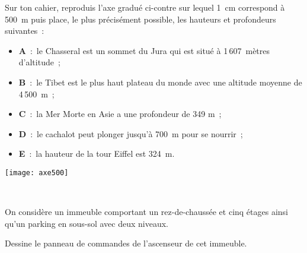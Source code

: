 \begin{exercice}
Sur ton cahier, reproduis l'axe gradué ci-contre sur lequel 1 cm correspond à 500 m puis place, le plus précisément possible, les hauteurs et profondeurs suivantes :

\begin{minipage}[c]{0.8\linewidth}
\begin{itemize}
 \item \textbf{A} : le Chasseral est un sommet du Jura qui est situé à 1\,607 mètres d'altitude ;
 \item \textbf{B} : le Tibet est le plus haut plateau du monde avec une altitude moyenne de 4\,500 m ;
 \item \textbf{C} : la Mer Morte en Asie a une profondeur de 349 m ;
 \item \textbf{D} : le cachalot peut plonger jusqu'à 700 m pour se nourrir ;
 \item \textbf{E} : la hauteur de la tour Eiffel est 324 m.
 \end{itemize}
 \end{minipage} \hfill%
 \begin{minipage}[c]{0.15\linewidth}
 \texttt{[image: axe500]}
  \end{minipage} \\
\end{exercice}


\begin{exercice}
On considère un immeuble comportant un rez-de-chaussée et cinq étages ainsi qu'un parking en sous-sol avec deux niveaux. 

Dessine le panneau de commandes de l'ascenseur de cet immeuble.
\end{exercice}



